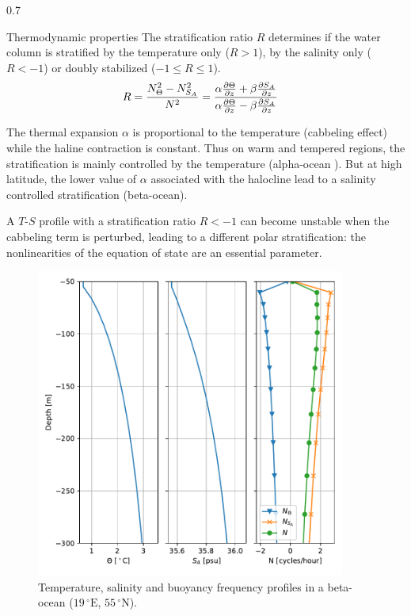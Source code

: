 \documentclass[final]{beamer}
\newlength{\colwidth}
\begin{document}
\begin{frame}[t]
\begin{columns}[t]
\begin{column}{0.7\colwidth}
\begin{alertblock}{Thermodynamic properties}
    The stratification ratio $R$ determines if the water column is stratified
    by the temperature only ($R>1$), by the salinity only ($R<-1$) or doubly
    stabilized ($-1 \leq R \leq 1$).
    \begin{align}
      R &= \frac{N_\Theta^2 - N_{S_A}^2}{N^2}
      = \frac{\alpha \pdv{\Theta}{z} + \beta \pdv{S_A}{z}}
      {\alpha \pdv{\Theta}{z} - \beta \pdv{S_A}{z}}
    \end{align}
    
    The thermal expansion $\alpha$ is proportional to the temperature
    (cabbeling effect) while the haline contraction is constant.    
    Thus on warm and tempered regions, the stratification is mainly controlled
    by the temperature (alpha-ocean \citep{carmack_alpha/beta_2007}).
    But at high latitude, the lower value of $\alpha$ associated
    with the halocline lead to a salinity controlled stratification (beta-ocean).

    A $T$-$S$ profile with a stratification ratio $R<-1$ can become unstable when
    the cabbeling term is perturbed, leading to a different polar stratification:
    the nonlinearities of the equation of state are an essential parameter.
    
    
    \begin{figure}
      \includegraphics[width=4in]{strati}
      \caption{Temperature, salinity and buoyancy frequency profiles
        in a beta-ocean ($19\,^\circ\text{E}$, $55\,^\circ\text{N}$).}
      
    \end{figure}
    

\end{alertblock}
\end{column}
\end{columns}
\end{frame}
\end{document}
